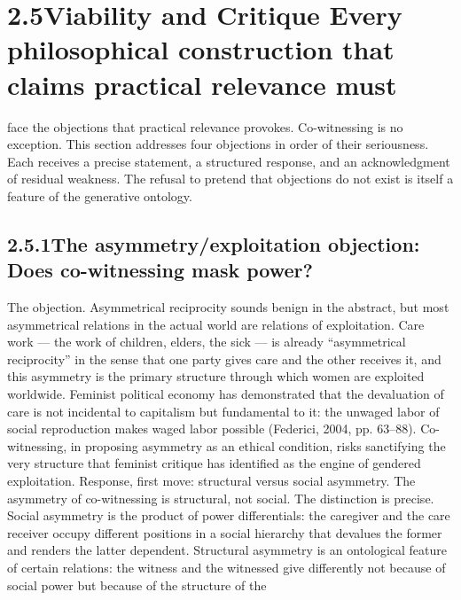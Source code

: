 \section{2.5\quad Viability and Critique Every philosophical construction that claims practical relevance must}

face the objections that practical relevance provokes. Co-witnessing is no exception. This section addresses four objections in order of their seriousness. Each receives a precise statement, a structured response, and an acknowledgment of residual weakness. The refusal to pretend that objections do not exist is itself a feature of the generative ontology.

\subsection{2.5.1\quad The asymmetry/exploitation objection: Does co-witnessing mask power?}

The objection. Asymmetrical reciprocity sounds benign in the abstract, but most asymmetrical relations in the actual world are relations of exploitation. Care work — the work of children, elders, the sick — is already “asymmetrical reciprocity” in the sense that one party gives care and the other receives it, and this asymmetry is the primary structure through which women are exploited worldwide. Feminist political economy has demonstrated that the devaluation of care is not incidental to capitalism but fundamental to it: the unwaged labor of social reproduction makes waged labor possible (Federici, 2004, pp. 63–88). Co-witnessing, in proposing asymmetry as an ethical condition, risks sanctifying the very structure that feminist critique has identified as the engine of gendered exploitation. Response, first move: structural versus social asymmetry. The asymmetry of co-witnessing is structural, not social. The distinction is precise. Social asymmetry is the product of power differentials: the caregiver and the care receiver occupy different positions in a social hierarchy that devalues the former and renders the latter dependent. Structural asymmetry is an ontological feature of certain relations: the witness and the witnessed give differently not because of social power but because of the structure of the

